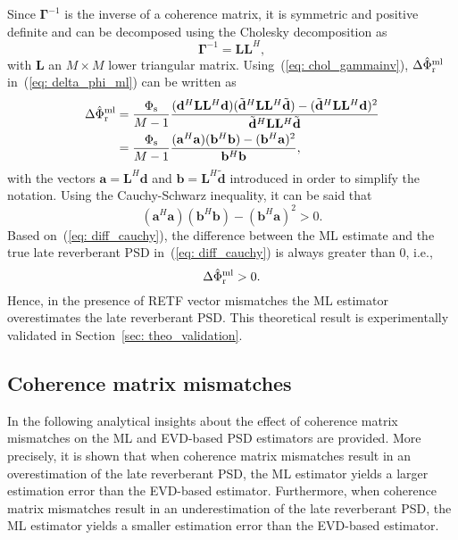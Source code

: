 \documentclass[10pt]{IEEEtran}
\begin{document}
Since $\boldsymbol{\Gamma}^{-1}$ is the inverse of a coherence matrix, it is symmetric and positive definite and can be decomposed using the Cholesky decomposition as
\begin{equation}
\label{eq: chol_gammainv}
\boldsymbol{\Gamma}^{-1} = \mathbf{L}\mathbf{L}^H,
\end{equation}
with $\mathbf{L}$ an $M \times M$ lower triangular matrix. 
Using~(\ref{eq: chol_gammainv}), $\Delta\hat{\Phi}^{\rm ml}_{\rm r}$ in~(\ref{eq: delta_phi_ml}) can be written as
\begin{align}
  \Delta\hat{\Phi}^{\rm ml}_{\rm r} & = \frac{\Phi_{\rm s}}{M-1} \frac{(\mathbf{d}^H\mathbf{L}\mathbf{L}^H\mathbf{d}) (\tilde{\mathbf{d}}^H \mathbf{L}\mathbf{L}^H\tilde{\mathbf{d}}) - ( \tilde{\mathbf{d}}^H \mathbf{L}\mathbf{L}^H\mathbf{d})^2 } {\tilde{\mathbf{d}}^H\mathbf{L}\mathbf{L}^H\tilde{\mathbf{d}}} \\
\label{eq: diff_cauchy}
& = \frac{\Phi_{\rm s}}{M-1} \frac{(\mathbf{a}^H\mathbf{a})(\mathbf{b}^H\mathbf{b}) - (\mathbf{b}^H\mathbf{a})^2} {\mathbf{b}^H\mathbf{b}},
\end{align}
with the vectors $\mathbf{a} = \mathbf{L}^H\mathbf{d}$ and $\mathbf{b} = \mathbf{L}^H\tilde{\mathbf{d}}$ introduced in order to simplify the notation.
Using the Cauchy-Schwarz inequality, it can be said that
\begin{equation}
(\mathbf{a}^H\mathbf{a})(\mathbf{b}^H\mathbf{b}) - (\mathbf{b}^H\mathbf{a})^2 > 0.
\end{equation}
Based on~(\ref{eq: diff_cauchy}), the difference between the ML estimate and the true late reverberant PSD in~(\ref{eq: diff_cauchy}) is always greater than $0$, i.e.,
\begin{equation}
\Delta\hat{\Phi}^{\rm ml}_{\rm r} > 0.
\end{equation}
Hence, in the presence of RETF vector mismatches the ML estimator overestimates the late reverberant PSD.
This theoretical result is experimentally validated in Section~\ref{sec: theo_validation}.

\subsection{Coherence matrix mismatches}
In the following analytical insights about the effect of coherence matrix mismatches on the ML and EVD-based PSD estimators are provided. 
More precisely, it is shown that when coherence matrix mismatches result in an overestimation of the late reverberant PSD, the ML estimator yields a larger estimation error than the EVD-based estimator. 
Furthermore, when coherence matrix mismatches result in an underestimation of the late reverberant PSD, the ML estimator yields a smaller estimation error than the EVD-based estimator. 
\end{document}
